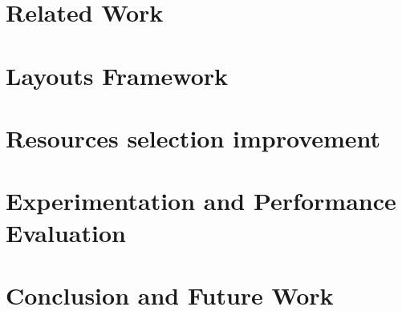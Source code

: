 \documentclass[conference]{IEEEtran}
\begin{document}
\section{Related Work}
\label{sec:related_work}


\section{Layouts Framework}


\section{Resources selection improvement}

\section{Experimentation and Performance Evaluation}

\label{sec:future}



\section{Conclusion and Future Work}














\end{document}
